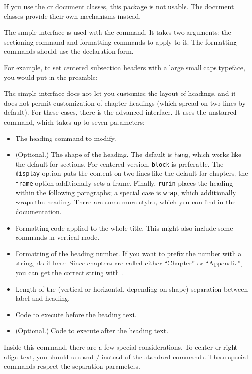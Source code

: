 \begin{gotcha}
If you use the  or 
document classes, this package is not usable.
The document classes provide their own mechanisms instead.
\end{gotcha}

The simple interface is used with the  command.
It takes two arguments: the sectioning command and formatting commands to apply to it.
The formatting commands should use the declaration form.

For example, to set centered subsection headers with a large small caps typeface,
you would put in the preamble:
\begin{ExampleCode}
\usepackage{titlesec}
\titleformat*{\subsection}{\centering\Large\scshape}
\end{ExampleCode}

The simple interface does not let you customize the layout of headings,
and it does not permit customization of chapter headings (which spread on two lines by default).
For these cases, there is the advanced interface.
It uses the unstarred  command,
which takes up to seven parameters:
\begin{itemize}
\item The heading command to modify.
\item (Optional.) The shape of the heading.
    The default is \verb|hang|, which works like the default for sections.
    For centered version, \verb|block| is preferable.
    The \verb|display| option puts the content on two lines like the default for chapters;
    the \verb|frame| option additionally sets a frame.
    Finally, \verb|runin| places the heading within the following paragraphs;
    a special case is \verb|wrap|, which additionally wraps the heading.
    There are some more styles, which you can find in the documentation.
\item Formatting code applied to the whole title.
    This might also include some commands in vertical mode.
\item Formatting of the heading number.
    If you want to prefix the number with a string, do it here.
    Since chapters are called either ``Chapter'' or ``Appendix'',
    you can get the correct string with .
\item Length of the (vertical or horizontal, depending on shape) separation between label and heading.
\item Code to execute before the heading text.
\item (Optional.) Code to execute after the heading text.
\end{itemize}
%
Inside this command, there are a few special considerations.
To center or right-align text, you should use  and /
instead of the standard commands.
These special commands respect the separation parameters.

